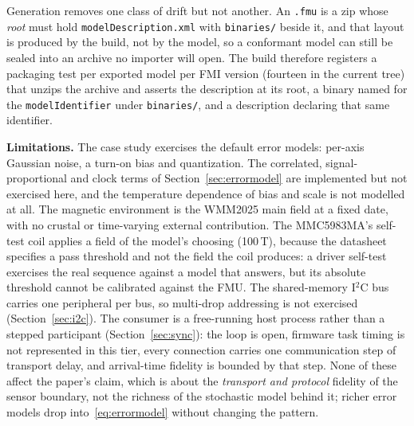 \documentclass[preprint,12pt,a4paper]{elsarticle}
\newcommand{\code}[1]{\texttt{\small #1}}
\begin{document}
Generation removes one class of drift but not another. An \code{.fmu} is a zip
whose \emph{root} must hold \code{modelDescription.xml} with \code{binaries/}
beside it, and that layout is produced by the build, not by the model, so a
conformant model can still be sealed into an archive no importer will open. The
build therefore registers a packaging test per exported model per FMI version
(fourteen in the current tree) that unzips the archive and asserts the
description at its root, a binary named for the \code{modelIdentifier} under
\code{binaries/}, and a description declaring that same identifier.

\textbf{Limitations.} The case study exercises the default error models:
per-axis Gaussian noise, a turn-on bias and quantization. The correlated,
signal-proportional and clock terms of Section~\ref{sec:errormodel} are
implemented but not exercised here, and the temperature dependence of bias and
scale is not modelled at all. The magnetic environment is the WMM2025 main field
at a fixed date, with no crustal or time-varying external contribution. The
MMC5983MA's self-test coil applies a field of the model's choosing
(100\,\textmu T), because the datasheet specifies a pass threshold and not the
field the coil produces: a driver self-test exercises the real sequence against
a model that answers, but its absolute threshold cannot be calibrated against
the FMU. The shared-memory I$^2$C bus carries one peripheral per bus, so multi-drop
addressing is not exercised (Section~\ref{sec:i2c}). The consumer is a
free-running host process rather than a stepped participant
(Section~\ref{sec:sync}): the loop is open, firmware task timing is not
represented in this tier, every connection carries one communication step of
transport delay, and arrival-time fidelity is bounded by that step. None of
these affect the
paper's claim, which is about the \emph{transport and protocol} fidelity of the
sensor boundary, not the richness of the stochastic model behind it; richer
error models drop into~\eqref{eq:errormodel} without changing the pattern.

\end{document}
